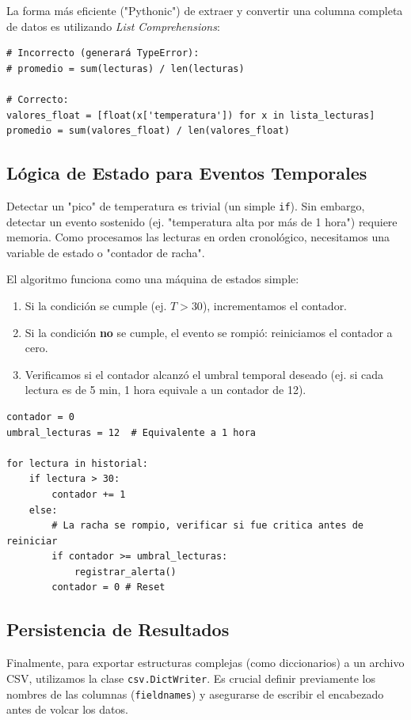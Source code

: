 \documentclass[11pt, a4paper]{article}
\begin{document}
La forma más eficiente ("Pythonic") de extraer y convertir una columna completa de datos es utilizando \textit{List Comprehensions}:

\begin{lstlisting}[caption={Extracción y conversión eficiente}]
# Incorrecto (generará TypeError):
# promedio = sum(lecturas) / len(lecturas)

# Correcto:
valores_float = [float(x['temperatura']) for x in lista_lecturas]
promedio = sum(valores_float) / len(valores_float)
\end{lstlisting}

\subsection{Lógica de Estado para Eventos Temporales}
Detectar un "pico" de temperatura es trivial (un simple \texttt{if}). Sin embargo, detectar un evento sostenido (ej. "temperatura alta por más de 1 hora") requiere memoria. Como procesamos las lecturas en orden cronológico, necesitamos una variable de estado o "contador de racha".

El algoritmo funciona como una máquina de estados simple:
\begin{enumerate}
    \item Si la condición se cumple (ej. $T > 30$), incrementamos el contador.
    \item Si la condición \textbf{no} se cumple, el evento se rompió: reiniciamos el contador a cero.
    \item Verificamos si el contador alcanzó el umbral temporal deseado (ej. si cada lectura es de 5 min, 1 hora equivale a un contador de 12).
\end{enumerate}

\begin{lstlisting}[caption={Algoritmo de detección de rachas}]
contador = 0
umbral_lecturas = 12  # Equivalente a 1 hora

for lectura in historial:
    if lectura > 30:
        contador += 1
    else:
        # La racha se rompio, verificar si fue critica antes de reiniciar
        if contador >= umbral_lecturas:
            registrar_alerta()
        contador = 0 # Reset
\end{lstlisting}

\subsection{Persistencia de Resultados}
Finalmente, para exportar estructuras complejas (como diccionarios) a un archivo CSV, utilizamos la clase \texttt{csv.DictWriter}. Es crucial definir previamente los nombres de las columnas (\texttt{fieldnames}) y asegurarse de escribir el encabezado antes de volcar los datos.
\end{document}
